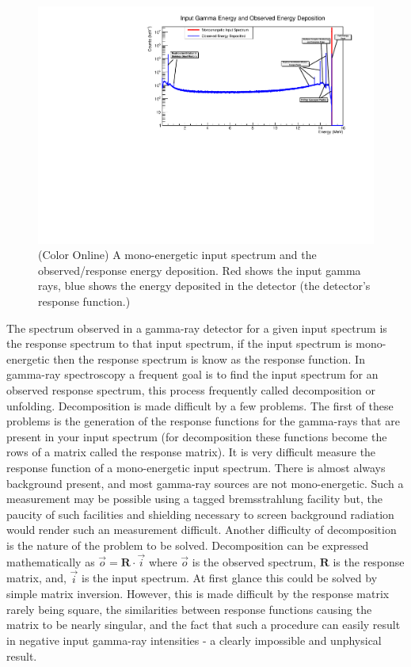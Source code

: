 \documentclass[5p]{elsarticle}
\begin{document}
\begin{figure}[t]
\begin{center}
\includegraphics[width=\linewidth]{comparison_pdf}
\caption{(Color Online) A mono-energetic input spectrum and the observed/response energy deposition. Red shows the input gamma rays, blue shows the energy deposited in the detector (the detector's response function.)}
\label{fig-input-vs-response}
\end{center}
\end{figure}

The spectrum observed in a gamma-ray detector for a given input spectrum is the response spectrum to that input spectrum, if the input spectrum is mono-energetic then the response spectrum is know as the response function. In gamma-ray spectroscopy a frequent goal is to find the input spectrum for an observed response spectrum, this process frequently called decomposition or unfolding. Decomposition is made difficult by a few problems. The first of these problems is the generation of the response functions for the gamma-rays that are present in your input spectrum (for decomposition these functions become the rows of a matrix called the response matrix). It is very difficult measure the response function of a mono-energetic input spectrum. There is almost always background present, and most gamma-ray sources are not mono-energetic. Such a measurement may be possible using a tagged bremsstrahlung facility but, the paucity of such facilities and shielding necessary to screen background radiation would render such an measurement difficult. Another difficulty of decomposition is the nature of the problem to be solved. Decomposition can be expressed mathematically as $\vec{o} = \mathbf{R}\cdot{}\vec{i}$ where $\vec{o}$ is the observed spectrum, $\mathbf{R}$ is the response matrix, and, $\vec{i}$ is the input spectrum. At first glance this could be solved by simple matrix inversion. However, this is made difficult by the response matrix rarely being square, the similarities between response functions causing the matrix to be nearly singular, and the fact that such a procedure can easily result in negative input gamma-ray intensities - a clearly impossible and unphysical result.
\end{document}
